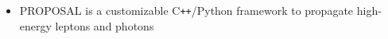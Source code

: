 
\begin{frame}[c]
    \begin{columns}[onlytextwidth]
        \begin{column}{0.5\textwidth}
            \begin{itemize}
                \item PROPOSAL is a customizable C\texttt{++}/Python framework to propagate high-energy leptons and photons 
            \end{itemize}
        \end{column}
        \begin{column}{0.5\textwidth}
            \begin{center}
            \end{center}

        \end{column}
    \end{columns}
\end{frame}